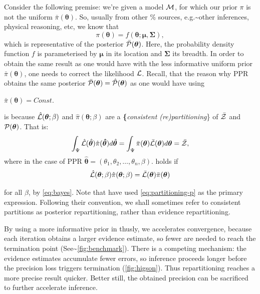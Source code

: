 \documentclass[draft,usenatbib]{mnras}
\begin{document}
Consider the following premise: we're given a model \({\cal M}\),
for which our prior \(\pi\) is not the uniform
\(\bar{\pi}(\bm{\theta})\). So, usually from other \% sources,
e.g.\textasciitilde{}other inferences, physical reasoning, etc, we know that
\begin{equation}
 \pi (\bm{\theta}) = f(\bm{\theta}; \bm{\mu}, \bm{\Sigma}),
 \label{eq:bias}
 \end{equation}
which is representative of the posterior \(\bar{\cal
   P}(\bm{\theta})\). Here, the probability density function \(f\) is
parameterised by \(\bm{\mu}\) in its location and \(\bm{\Sigma}\)
its breadth. In order to obtain the same result as one would have
with the less informative uniform prior \(\bar{\pi}(\bm{\theta})\),
one needs to correct the likelihood \({\cal L}\). Recall, that the
reason why PPR obtains the same posterior \(\bar{\cal
   P}(\bm{\theta})= \hat{\cal P}(\bm{\theta})\) as one would have
using 

\(\bar{\pi} (\bm{\theta}) = Const.\) 

is because \(\hat{\cal
   L} (\bm{\theta};\beta)\) and \(\hat{\pi} (\bm{\theta};\beta)\) are
a \textbf\{\emph{consistent (re)partitioning}\} of \(\bar{\cal Z}\)
and \({\cal P}(\bm{\theta})\). That is:
\begin{equation}
\label{eq:partitioning}
\int_{\Psi} \hat{\cal L} (\hat{\bm{\theta}}) \hat{\pi} (\bm{\hat{\theta}}) d\hat{\bm{\theta}}  = \int_{\Psi}\bar{\pi} (\bm{\theta}) \bar{\cal L} (\bm{\theta}) d\bm{\theta} = \bar{\cal Z},
\end{equation}
where in the case of PPR
\(\hat{\bm{\theta}} = (\theta_{1}, \theta_{2}, \ldots, \theta_{n},
   \beta)\).  holds if
\begin{equation}
\label{eq:partitioning-p}
\hat{\cal L}(\bm{\theta};\beta) \hat{\pi}(\bm{\theta};\beta)  = \bar{\cal L}(\bm{\theta})\bar{\pi}(\bm{\theta})
\end{equation}

for all \(\beta\), by \cref{eq:bayes}. Note that
\cite{chen-ferroz-hobson} have used \cref{eq:partitioning-p} as the
primary expression. Following their convention, we shall sometimes
refer to consistent partitions as posterior repartitioning, rather
than evidence repartitioning.

By using a more informative prior in thusly, we accelerates
convergence, because each iteration obtains a larger evidence
estimate, so fewer are needed to reach the termination point
(See\textasciitilde{}\cref{fig:benchmark}). There is a competing mechanism: the
evidence estimates accumulate fewer errors, so inference proceeds
longer before the precision loss triggers termination
(\cref{fig:higson}). Thus repartitioning reaches a more precise
result quicker. Better still, the obtained precision can be
sacrificed to further accelerate inference.
\end{document}
